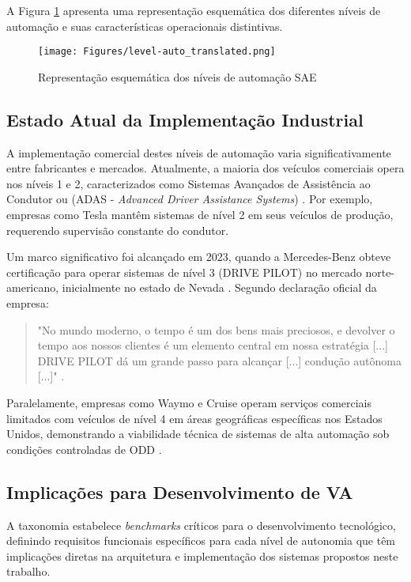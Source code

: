 A Figura \ref{niveis-auto} apresenta uma representação esquemática dos diferentes níveis de automação e suas características operacionais distintivas.

\begin{figure}[H]
\centering
\texttt{[image: Figures/level-auto\_translated.png]}
\caption{Representação esquemática dos níveis de automação SAE \cite{review-auto}}
\label{niveis-auto}
\end{figure}

\subsection{Estado Atual da Implementação Industrial}

A implementação comercial destes níveis de automação varia significativamente entre fabricantes e mercados. Atualmente, a maioria dos veículos comerciais opera nos níveis 1 e 2, caracterizados como Sistemas Avançados de Assistência ao Condutor ou (ADAS - \textit{Advanced Driver Assistance Systems}) \cite{4cenarios_ocidental}. Por exemplo, empresas como Tesla mantêm sistemas de nível 2 em seus veículos de produção, requerendo supervisão constante do condutor.

Um marco significativo foi alcançado em 2023, quando a Mercedes-Benz obteve certificação para operar sistemas de nível 3 (DRIVE PILOT) no mercado norte-americano, inicialmente no estado de Nevada \cite{mercedes3}. Segundo declaração oficial da empresa:

\begin{quote}
"No mundo moderno, o tempo é um dos bens mais preciosos, e devolver o tempo aos nossos clientes é um elemento central em nossa estratégia [...] DRIVE PILOT dá um grande passo para alcançar [...] condução autônoma [...]" \cite{mercedes3}.
\end{quote}

Paralelamente, empresas como Waymo e Cruise operam serviços comerciais limitados com veículos de nível 4 em áreas geográficas específicas nos Estados Unidos, demonstrando a viabilidade técnica de sistemas de alta automação sob condições controladas de ODD \cite{Houser2023-dn}.

\subsection{Implicações para Desenvolvimento de VA} \label{subsec:implicacoes_validacao}

A taxonomia  estabelece \textit{benchmarks} críticos para o desenvolvimento tecnológico, definindo requisitos funcionais específicos para cada nível de autonomia que têm implicações diretas na arquitetura e implementação dos sistemas propostos neste trabalho.

